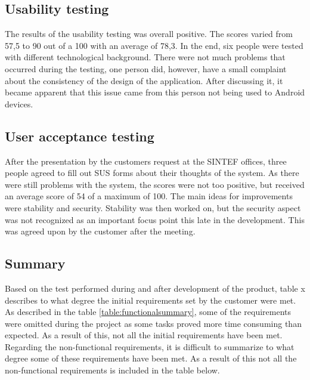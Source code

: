 		\subsection{Usability testing}
		The results of the usability testing was overall positive. The scores varied from 57,5 to 90 out of a 100 with an average of 78,3. In the end, six people were tested with different technological background. There were not much problems that occurred during the testing, one person did, however, have a small complaint about the consistency of the design of the application. After discussing it, it became apparent that this issue came from this person not being used to Android devices. 


		\subsection{User acceptance testing}
		After the presentation by the customers request at the SINTEF offices, three people agreed to fill out SUS forms about their thoughts of the system. As there were still problems with the system, the scores were not too positive, but received an average score of 54 of a maximum of 100. The main ideas for improvements were stability and security. Stability was then worked on, but the security aspect was not recognized as an important focus point this late in the development. This was agreed upon by the customer after the meeting.

		\subsection{Summary}
		Based on the test performed during and after development of the product, table x describes to what degree the initial requirements set by the customer were met. As described in the table \ref{table:functionalsummary}, some of the requirements were omitted during the project as some tasks proved more time consuming than expected. As a result of this, not all the initial requirements have been met. \\
		\newline
		Regarding the non-functional requirements, it is difficult to summarize to what degree some of these requirements have been met. As a result of this not all the non-functional requirements is included in the table below.

